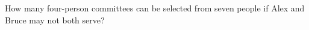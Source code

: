 How many four-person committees can be selected from seven people if Alex and Bruce may not both serve?
